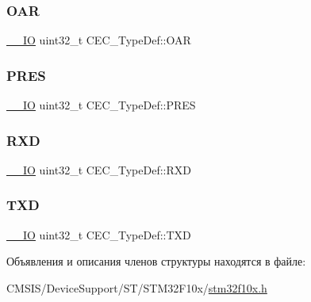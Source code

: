 \subsubsection{\texorpdfstring{OAR}{OAR}}
{\footnotesize\ttfamily \mbox{\hyperlink{group___c_m_s_i_s___c_m3__core__definitions_gaec43007d9998a0a0e01faede4133d6be}{\+\_\+\+\_\+\+IO}} uint32\+\_\+t C\+E\+C\+\_\+\+Type\+Def\+::\+O\+AR}

\mbox{\label{struct_c_e_c___type_def_a2e1d5865f3d49a195e58f265b425256e}} 
\subsubsection{\texorpdfstring{PRES}{PRES}}
{\footnotesize\ttfamily \mbox{\hyperlink{group___c_m_s_i_s___c_m3__core__definitions_gaec43007d9998a0a0e01faede4133d6be}{\+\_\+\+\_\+\+IO}} uint32\+\_\+t C\+E\+C\+\_\+\+Type\+Def\+::\+P\+R\+ES}

\mbox{\label{struct_c_e_c___type_def_a13d5b0e5228d5cca9f7c5d8533705d21}} 
\subsubsection{\texorpdfstring{RXD}{RXD}}
{\footnotesize\ttfamily \mbox{\hyperlink{group___c_m_s_i_s___c_m3__core__definitions_gaec43007d9998a0a0e01faede4133d6be}{\+\_\+\+\_\+\+IO}} uint32\+\_\+t C\+E\+C\+\_\+\+Type\+Def\+::\+R\+XD}

\mbox{\label{struct_c_e_c___type_def_a462a952588fc45732d4545dbe79356da}} 
\subsubsection{\texorpdfstring{TXD}{TXD}}
{\footnotesize\ttfamily \mbox{\hyperlink{group___c_m_s_i_s___c_m3__core__definitions_gaec43007d9998a0a0e01faede4133d6be}{\+\_\+\+\_\+\+IO}} uint32\+\_\+t C\+E\+C\+\_\+\+Type\+Def\+::\+T\+XD}



Объявления и описания членов структуры находятся в файле\+:\begin{DoxyCompactItemize}
\item 
C\+M\+S\+I\+S/\+Device\+Support/\+S\+T/\+S\+T\+M32\+F10x/\mbox{\hyperlink{stm32f10x_8h}{stm32f10x.\+h}}\end{DoxyCompactItemize}
